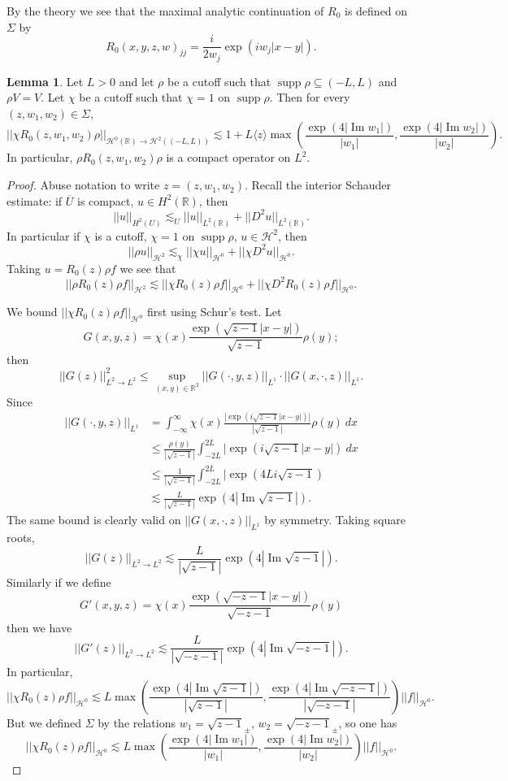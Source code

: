 \documentclass[12pt]{report}
\newcommand{\RR}{\mathbb{R}}
\DeclareMathOperator{\supp}{supp}
\renewcommand{\Im}{\operatorname{Im}}
\theoremstyle{definition}
\newtheorem{lemma}[theorem]{Lemma}
\begin{document}
By the theory we see that the maximal analytic continuation of $R_0$ is defined on $\Sigma$ by
$$R_0(x, y, z, w)_{jj} = \frac{i}{2w_j}\exp(iw_j|x-y|).$$

\begin{lemma}
\label{exponential bound on free resolvent}
Let $L > 0$ and let $\rho$ be a cutoff such that $\supp \rho \subseteq (-L, L)$ and $\rho V = V$.
Let $\chi$ be a cutoff such that $\chi = 1$ on $\supp \rho$.
Then for every $(z, w_1, w_2) \in \Sigma$,
$$||\chi R_0(z, w_1, w_2) \rho||_{\mathcal H^0(\RR) \to \mathcal H^2((-L, L))} \lesssim 1 + L\langle z\rangle\max\left(\frac{\exp(4 |\Im w_1|)}{|w_1|}, \frac{\exp(4 |\Im w_2|)}{|w_2|} \right).$$
In particular, $\rho R_0(z, w_1, w_2) \rho$ is a compact operator on $L^2$.
\end{lemma}
\begin{proof}
Abuse notation to write $z = (z, w_1, w_2)$.
Recall the interior Schauder estimate: if $\overline U$ is compact, $u \in H^2(\RR)$, then
$$||u||_{H^2(U)} \lesssim_U ||u||_{L^2(\RR)} + ||D^2u||_{L^2(\RR)}.$$
In particular if $\chi$ is a cutoff, $\chi = 1$ on $\supp \rho$, $u \in \mathcal H^2$, then
$$||\rho u||_{\mathcal H^2} \lesssim_\chi ||\chi u||_{\mathcal H^0} + ||\chi D^2 u||_{\mathcal H^0}.$$
Taking $u = R_0(z)\rho f$ we see that
$$||\rho R_0(z)\rho f||_{\mathcal H^2} \lesssim ||\chi R_0(z) \rho f||_{\mathcal H^0} + ||\chi D^2 R_0(z) \rho f||_{\mathcal H^0}.$$

We bound $||\chi R_0(z) \rho f||_{\mathcal H^0}$ first using Schur's test. Let
$$G(x, y, z) = \chi(x) \frac{\exp(\sqrt{z-1}|x-y|)}{\sqrt{z-1}} \rho(y);$$
then
$$||G(z)||_{L^2 \to L^2}^2 \leq \sup_{(x, y) \in \RR^2} ||G(\cdot, y, z)||_{L^1}\cdot||G(x, \cdot, z)||_{L^1}.$$
Since
\begin{align*}
||G(\cdot, y, z)||_{L^1} &= \int_{-\infty}^\infty \chi(x) \frac{|\exp(i\sqrt{z-1}|x-y|)|}{|\sqrt{z-1}|}\rho(y)~dx\\
&\leq \frac{\rho(y)}{|\sqrt{z-1}|} \int_{-2L}^{2L} |\exp(i\sqrt{z-1}|x-y|)~dx\\
&\leq \frac{1}{|\sqrt{z-1}|} \int_{-2L}^{2L} |\exp(4Li\sqrt{z-1})\\
&\lesssim \frac{L}{|\sqrt{z-1}|} \exp(4 |\Im\sqrt{z-1}|).
\end{align*}
The same bound is clearly valid on $||G(x, \cdot, z)||_{L^1}$ by symmetry. Taking square roots,
$$||G(z)||_{L^2 \to L^2} \lesssim \frac{L}{|\sqrt{z-1}|} \exp(4 |\Im\sqrt{z-1}|).$$
Similarly if we define
$$G'(x, y, z) = \chi(x) \frac{\exp(\sqrt{-z-1}|x-y|)}{\sqrt{-z-1}} \rho(y)$$
then we have
$$||G'(z)||_{L^2 \to L^2} \lesssim \frac{L}{|\sqrt{-z-1}|} \exp(4 |\Im \sqrt{-z-1}|).$$
In particular,
$$||\chi R_0(z) \rho f||_{\mathcal H^0} \lesssim L \max\left(\frac{\exp(4 |\Im \sqrt{z-1}|)}{|\sqrt{z-1}|}, \frac{\exp(4 |\Im \sqrt{-z-1}|)}{|\sqrt{-z-1}|} \right) ||f||_{\mathcal H^0}.$$
But we defined $\Sigma$ by the relations $w_1 = \sqrt{z-1}_\pm$, $w_2 = \sqrt{-z-1}_\pm$, so one has
$$||\chi R_0(z) \rho f||_{\mathcal H^0} \lesssim L \max\left(\frac{\exp(4 |\Im w_1|)}{|w_1|}, \frac{\exp(4 |\Im w_2|)}{|w_2|} \right) ||f||_{\mathcal H^0}.$$


\end{proof}
\end{document}
